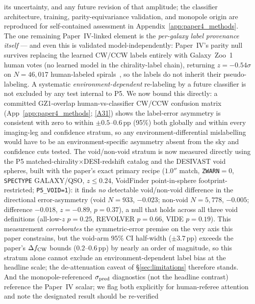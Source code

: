 \documentclass[aps,prd,twocolumn,superscriptaddress,showpacs,preprintnumbers,nofootinbib,longbibliography,floatfix]{revtex4-2}
\newcommand{\repoBase}{https://github.com/Hubify-Projects/bigbounce/blob/main}
\begin{document}
\begin{itemize}
{its uncertainty, and any future revision of that amplitude}; the classifier
architecture, training, parity-equivariance validation, and monopole origin
are reproduced for self-contained assessment in
Appendix~\ref{app:paper4_methods}. The one remaining Paper~IV-linked
element is the \emph{per-galaxy label provenance itself} --- and even this
is validated model-independently: Paper~IV's parity null survives replacing
the learned CW/CCW labels entirely with Galaxy~Zoo~1 human votes (no learned
model in the chirality-label chain), returning $z=-0.54\sigma$ on
$N=46{,}017$ human-labeled spirals~\cite{golden_chirality_2026}, so the
labels do not inherit their pseudo-labeling. A systematic \emph{environment-dependent}
re-labeling by a future classifier is not excluded by any test internal to
P5. We now bound this directly: a committed GZ1-overlap human-vs-classifier
CW/CCW confusion matrix (App~\ref{app:paper4_methods};
\href{\repoBase/pipelines/p2\_chirality/outputs/gz1\_stratified\_confusion.json}{[A31]})
shows the label-error asymmetry is consistent with zero to within
$\pm0.5$--$0.6$\,pp (95\%) both globally and within every imaging-leg and
confidence stratum, so any environment-differential mislabelling would have
to be an environment-specific asymmetry absent from the sky and confidence
cuts tested. The void/non-void stratum is now measured directly using the
P5 matched-chirality$\times$DESI-redshift catalog and the DESIVAST void
spheres, built with the paper's exact primary recipe ($1.0''$ match,
\texttt{ZWARN}$=0$, \texttt{SPECTYPE} GALAXY/QSO, $z\le0.24$, VoidFinder
point-in-sphere footprint-restricted; \texttt{P5\_VOID=1}): it finds
\emph{no} detectable void/non-void difference in the directional
error-asymmetry (void $N=933$, $-0.023$; non-void $N=5{,}778$, $-0.005$;
difference $-0.018$, $z=-0.89$, $p=0.37$), a null that holds across all
three void definitions (all-low-$z$ $p=0.25$, REVOLVER $p=0.66$, VIDE
$p=0.19$). This measurement \emph{corroborates} the symmetric-error premise
on the very axis this paper constrains, but the void-arm $95\%$ CI
half-width ($\pm3.7$\,pp) exceeds the paper's $\Delta f_{\rm CW}$ bounds
($0.2$--$0.6$\,pp) by nearly an order of magnitude, so this stratum alone
cannot exclude an environment-dependent label bias at the headline scale;
the de-attenuation caveat of \S\ref{sec:limitations} therefore stands. And the
monopole-referenced $\sigma_{\rm pred}$ diagnostics (not the
headline contrast) reference the Paper~IV scalar; we flag both explicitly
for human-referee attention and note the designated result should be re-verified

\end{itemize}
\end{document}
